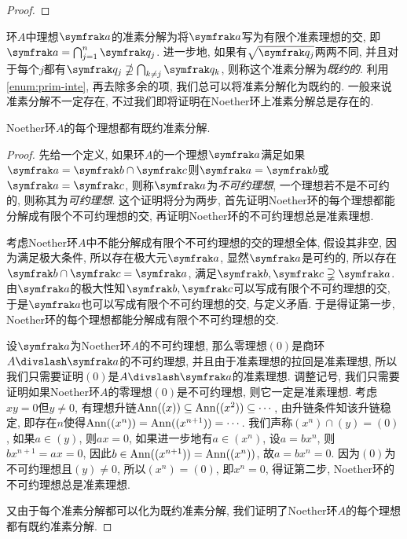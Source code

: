 \begin{proof}
\end{proof}

环$A$中理想$\ideal{a}$的准素分解为将$\ideal{a}$写为有限个准素理想的交, 即$\ideal{a}=\bigcap_{j=1}^n\ideal{q}_j$. 进一步地, 如果有$\sqrt{\ideal{q}_j}$两两不同, 并且对于每个$j$都有$\ideal{q}_j\nsupseteq\bigcap_{k\neq j}\ideal{q}_k$, 则称这个准素分解为\emph{既约的}. 利用\ref{enum:prim-inte}, 再去除多余的项, 我们总可以将准素分解化为既约的. 一般来说准素分解不一定存在, 不过我们即将证明在Noether环上准素分解总是存在的.

\begin{theorem}
    Noether环$A$的每个理想都有既约准素分解.
\end{theorem}

\begin{proof}
    先给一个定义, 如果环$A$的一个理想$\ideal{a}$满足如果$\ideal{a}=\ideal{b}\cap\ideal{c}$则$\ideal{a}=\ideal{b}$或$\ideal{a}=\ideal{c}$, 则称$\ideal{a}$为\emph{不可约理想}, 一个理想若不是不可约的, 则称其为\emph{可约理想}. 这个证明将分为两步, 首先证明Noether环的每个理想都能分解成有限个不可约理想的交, 再证明Noether环的不可约理想总是准素理想.

    考虑Noether环$A$中不能分解成有限个不可约理想的交的理想全体, 假设其非空, 因为满足极大条件, 所以存在极大元$\ideal{a}$, 显然$\ideal{a}$是可约的, 所以存在$\ideal{b}\cap\ideal{c}=\ideal{a}$, 满足$\ideal{b}, \ideal{c}\supsetneqq\ideal{a}$. 由$\ideal{a}$的极大性知$\ideal{b}, \ideal{c}$可以写成有限个不可约理想的交, 于是$\ideal{a}$也可以写成有限个不可约理想的交, 与定义矛盾. 于是得证第一步, Noether环的每个理想都能分解成有限个不可约理想的交.

    设$\ideal{a}$为Noether环$A$的不可约理想, 那么零理想$(0)$是商环$A{\divslash}\ideal{a}$的不可约理想, 并且由于准素理想的拉回是准素理想, 所以我们只需要证明$(0)$是$A{\divslash}\ideal{a}$的准素理想. 调整记号, 我们只需要证明如果Noether环$A$的零理想$(0)$是不可约理想, 则它一定是准素理想. 考虑$xy=0$但$y\neq 0$, 有理想升链$\operatorname{Ann}((x))\subseteq\operatorname{Ann}((x^2))\subseteq\dotsb$, 由升链条件知该升链稳定, 即存在$n$使得$\operatorname{Ann}((x^n))=\operatorname{Ann}((x^{n+1}))=\dotsb$. 我们声称$(x^n)\cap (y)=(0)$, 如果$a\in (y)$, 则$ax=0$, 如果进一步地有$a\in (x^n)$, 设$a=bx^n$, 则$bx^{n+1}=ax=0$, 因此$b\in\operatorname{Ann}((x^{n+1}))=\operatorname{Ann}((x^n))$, 故$a=bx^n=0$. 因为$(0)$为不可约理想且$(y)\neq 0$, 所以$(x^n)=(0)$, 即$x^n=0$, 得证第二步, Noether环的不可约理想总是准素理想.

    又由于每个准素分解都可以化为既约准素分解, 我们证明了Noether环$A$的每个理想都有既约准素分解.
\end{proof}

